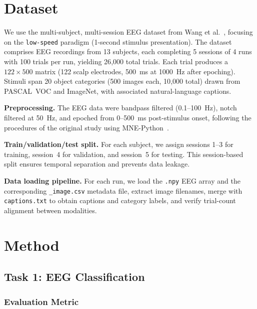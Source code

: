 \documentclass{article}
\begin{document}
\section{Dataset}
\label{sec:dataset}

We use the multi-subject, multi-session EEG dataset from Wang et al.~\cite{wang2025eeg}, focusing on the \texttt{low-speed} paradigm (1-second stimulus presentation). The dataset comprises EEG recordings from 13 subjects, each completing 5 sessions of 4 runs with 100 trials per run, yielding 26{,}000 total trials. Each trial produces a $122 \times 500$ matrix (122 scalp electrodes, 500~ms at 1000~Hz after epoching). Stimuli span 20 object categories (500 images each, 10{,}000 total) drawn from PASCAL~VOC and ImageNet, with associated natural-language captions.

\textbf{Preprocessing.} The EEG data were bandpass filtered (0.1--100~Hz), notch filtered at 50~Hz, and epoched from 0--500~ms post-stimulus onset, following the procedures of the original study using MNE-Python~\cite{gramfort2014mne}.

\textbf{Train/validation/test split.} For each subject, we assign sessions 1--3 for training, session~4 for validation, and session~5 for testing. This session-based split ensures temporal separation and prevents data leakage.

\textbf{Data loading pipeline.} For each run, we load the \texttt{.npy} EEG array and the corresponding \texttt{\_image.csv} metadata file, extract image filenames, merge with \texttt{captions.txt} to obtain captions and category labels, and verify trial-count alignment between modalities.

\section{Method}
\label{sec:method}

\subsection{Task 1: EEG Classification}

\subsubsection{Evaluation Metric}
\end{document}
